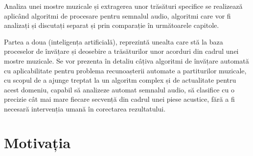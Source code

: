 \documentclass[a4paper,12pt]{report}
\begin{document}
Analiza unei mostre muzicale
și extragerea unor trăsături specifice se realizează aplicând algoritmi 
de procesare pentru semnalul audio, algoritmi care vor fi analizați și 
discutați separat și prin comparație în următoarele capitole.

Partea a doua (inteligența artificială), reprezintă unealta care stă la 
baza proceselor de învățare și deosebire a trăsăturilor unor acorduri din
cadrul unei mostre muzicale. Se vor prezenta în detaliu câțiva 
algoritmi de învățare automată cu aplicabilitate pentru problema recunoașterii
automate a partiturilor muzicale, 
cu scopul de a ajunge treptat la un algoritm complex și de actualitate pentru 
acest domeniu, capabil să analizeze automat semnalul audio, 
să clasifice cu o precizie cât mai mare fiecare secvență din cadrul unei 
piese acustice, fără a fi necesară intervenția umană în corectarea rezultatului.

\section{Motivația}
\end{document}
